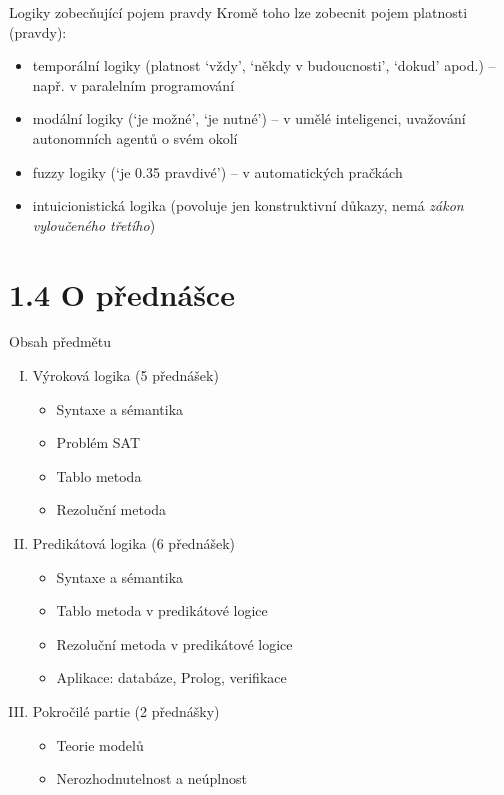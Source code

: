 \documentclass{beamer}
\begin{document}
\begin{frame}{Logiky zobecňující pojem pravdy}
    Kromě toho lze zobecnit pojem platnosti (pravdy):
    
    \begin{itemize}        
        \item \alert{temporální logiky} (platnost `vždy', `někdy v budoucnosti', `dokud' apod.) -- např. v paralelním programování
        \item \alert{modální logiky} (`je možné', `je nutné') -- v umělé inteligenci, uvažování autonomních agentů o svém okolí
        \item \alert{fuzzy logiky} (`je 0.35 pravdivé') -- v automatických pračkách
        \item \alert{intuicionistická logika} (povoluje jen konstruktivní důkazy, nemá \emph{zákon vyloučeného třetího})
    \end{itemize}
\end{frame}


\section{1.4 O přednášce}


\begin{frame}{Obsah předmětu}

    \begin{enumerate}[I.]
        \item Výroková logika (5 přednášek)
        \begin{itemize}
            \item Syntaxe a sémantika
            \item Problém SAT
            \item Tablo metoda
            \item Rezoluční metoda
        \end{itemize}
        \item Predikátová logika (6 přednášek)
        \begin{itemize}
            \item Syntaxe a sémantika
            \item Tablo metoda v predikátové logice
            \item Rezoluční metoda v predikátové logice
            \item Aplikace: databáze, Prolog, verifikace
        \end{itemize}
        \item Pokročilé partie (2 přednášky)
        \begin{itemize}
            \item Teorie modelů
            \item Nerozhodnutelnost a neúplnost
        \end{itemize}
    \end{enumerate}    

\end{frame}
\end{document}
